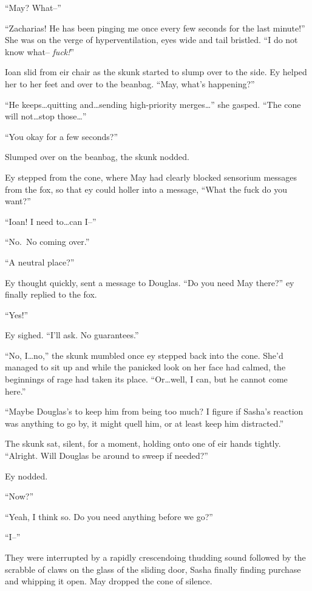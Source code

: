 ``May? What--''

``Zacharias! He has been pinging me once every few seconds for the last minute!'' She was on the verge of hyperventilation, eyes wide and tail bristled. ``I do not know what-- \emph{fuck!}''

Ioan slid from eir chair as the skunk started to slump over to the side. Ey helped her to her feet and over to the beanbag. ``May, what's happening?''

``He keeps\ldots quitting and\ldots sending high-priority merges\ldots{}'' she gasped. ``The cone will not\ldots stop those\ldots{}''

``You okay for a few seconds?''

Slumped over on the beanbag, the skunk nodded.

Ey stepped from the cone, where May had clearly blocked sensorium messages from the fox, so that ey could holler into a message, ``What the fuck do you want?''

``Ioan! I need to\ldots can I--''

``No.~No coming over.''

``A neutral place?''

Ey thought quickly, sent a message to Douglas. ``Do you need May there?'' ey finally replied to the fox.

``Yes!''

Ey sighed. ``I'll ask. No guarantees.''

``No, I\ldots no,'' the skunk mumbled once ey stepped back into the cone. She'd managed to sit up and while the panicked look on her face had calmed, the beginnings of rage had taken its place. ``Or\ldots well, I can, but he cannot come here.''

``Maybe Douglas's to keep him from being too much? I figure if Sasha's reaction was anything to go by, it might quell him, or at least keep him distracted.''

The skunk sat, silent, for a moment, holding onto one of eir hands tightly. ``Alright. Will Douglas be around to sweep if needed?''

Ey nodded.

``Now?''

``Yeah, I think so. Do you need anything before we go?''

``I--''

They were interrupted by a rapidly crescendoing thudding sound followed by the scrabble of claws on the glass of the sliding door, Sasha finally finding purchase and whipping it open. May dropped the cone of silence.

